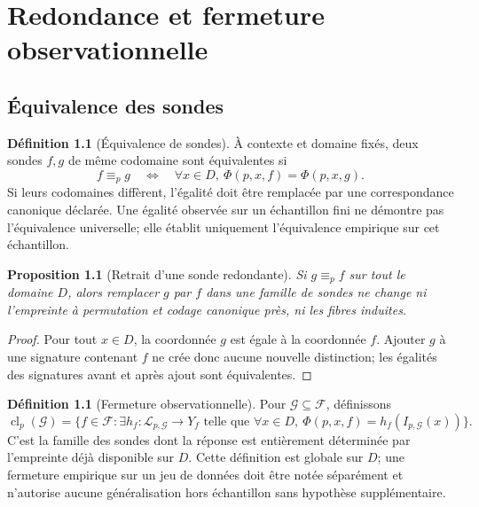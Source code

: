 \documentclass[11pt,oneside]{book}
\newtheorem{proposition}[theoreme]{Proposition}
\theoremstyle{definition}
\newtheorem{definition}[theoreme]{Définition}
\theoremstyle{remark}
\newcommand{\Fcal}{\mathcal F}
\newcommand{\Gcal}{\mathcal G}
\newcommand{\Lcal}{\mathcal L}
\newcommand{\1}{\mathbf 1}
\newcommand{\cl}{\operatorname{cl}}
\begin{document}
\chapter{Redondance et fermeture observationnelle}
\section{Équivalence des sondes}
\begin{definition}[Équivalence de sondes]
À contexte et domaine fixés, deux sondes $f,g$ de même codomaine sont équivalentes si
\[
f\equiv_p g\quad\Longleftrightarrow\quad\forall x\in D,\ \Phi(p,x,f)=\Phi(p,x,g).
\]
Si leurs codomaines diffèrent, l'égalité doit être remplacée par une correspondance canonique déclarée. Une égalité observée sur un échantillon fini ne démontre pas l'équivalence universelle; elle établit uniquement l'équivalence empirique sur cet échantillon.
\end{definition}

\begin{proposition}[Retrait d'une sonde redondante]
Si $g\equiv_p f$ sur tout le domaine $D$, alors remplacer $g$ par $f$ dans une famille de sondes ne change ni l'empreinte à permutation et codage canonique près, ni les fibres induites.
\end{proposition}
\begin{proof}
Pour tout $x\in D$, la coordonnée $g$ est égale à la coordonnée $f$. Ajouter $g$ à une signature contenant $f$ ne crée donc aucune nouvelle distinction; les égalités des signatures avant et après ajout sont équivalentes.
\end{proof}

\begin{definition}[Fermeture observationnelle]
Pour $\Gcal\subseteq\Fcal$, définissons
\[
\cl_p(\Gcal)=\{f\in\Fcal:\exists h_f:\Lcal_{p,\Gcal}\to Y_f\text{ telle que }\forall x\in D,\ \Phi(p,x,f)=h_f(I_{p,\Gcal}(x))\}.
\]
C'est la famille des sondes dont la réponse est entièrement déterminée par l'empreinte déjà disponible sur $D$. Cette définition est globale sur $D$; une fermeture empirique sur un jeu de données doit être notée séparément et n'autorise aucune généralisation hors échantillon sans hypothèse supplémentaire.
\end{definition}
\end{document}
